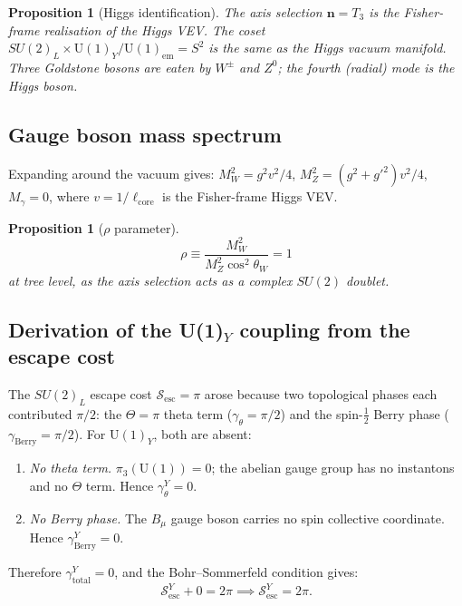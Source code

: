 \documentclass[12pt]{article}
\newtheorem{proposition}[theorem]{Proposition}
\theoremstyle{definition}
\theoremstyle{remark}
\begin{document}
\begin{proposition}[Higgs identification]
The axis selection $\mathbf{n}=T_3$ is the Fisher-frame realisation of the Higgs
VEV.  The coset $SU(2)_L\times\mathrm{U}(1)_Y/\mathrm{U}(1)_{\mathrm{em}}=S^2$
is the same as the Higgs vacuum manifold.  Three Goldstone bosons are eaten
by $W^\pm$ and $Z^0$; the fourth (radial) mode is the Higgs boson.
\end{proposition}

\subsection{Gauge boson mass spectrum}

Expanding around the vacuum gives:
$M_W^2=g^2v^2/4$, $M_Z^2=(g^2+g'^2)v^2/4$, $M_\gamma=0$,
where $v=1/\ell_{\mathrm{core}}$ is the Fisher-frame Higgs VEV.

\begin{proposition}[$\rho$ parameter]
\begin{equation}
\rho\equiv\frac{M_W^2}{M_Z^2\cos^2\theta_W}=1
\end{equation}
at tree level, as the axis selection acts as a complex $SU(2)$ doublet.
\end{proposition}

\subsection{Derivation of the U(1)$_Y$ coupling from the escape cost}

The $SU(2)_L$ escape cost $\mathcal{S}_{\mathrm{esc}}=\pi$ arose because two
topological phases each contributed $\pi/2$: the $\Theta=\pi$ theta term
($\gamma_\theta=\pi/2$) and the spin-$\tfrac{1}{2}$ Berry phase
($\gamma_{\mathrm{Berry}}=\pi/2$).  For $\mathrm{U}(1)_Y$, both are absent:

\begin{enumerate}
\item \emph{No theta term.}  $\pi_3(\mathrm{U}(1))=0$; the abelian gauge group
  has no instantons and no $\Theta$ term.  Hence $\gamma_\theta^Y=0$.
\item \emph{No Berry phase.}  The $B_\mu$ gauge boson carries no spin
  collective coordinate.  Hence $\gamma_{\mathrm{Berry}}^Y=0$.
\end{enumerate}

Therefore $\gamma_{\mathrm{total}}^Y=0$, and the Bohr--Sommerfeld condition gives:
\begin{equation}
\mathcal{S}_{\mathrm{esc}}^Y+0=2\pi\implies\mathcal{S}_{\mathrm{esc}}^Y=2\pi.
\end{equation}
\end{document}
